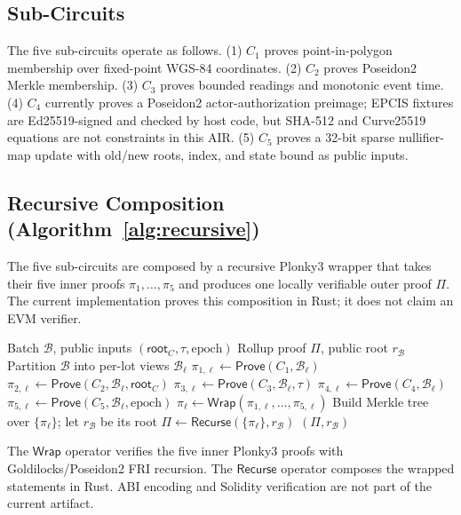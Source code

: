 \documentclass[journal]{IEEEtran}
\begin{document}
\subsection{Sub-Circuits}
The five sub-circuits operate as follows. (1) $C_1$ proves point-in-polygon membership over fixed-point WGS-84 coordinates. (2) $C_2$ proves Poseidon2 Merkle membership. (3) $C_3$ proves bounded readings and monotonic event time. (4) $C_4$ currently proves a Poseidon2 actor-authorization preimage; EPCIS fixtures are Ed25519-signed and checked by host code, but SHA-512 and Curve25519 equations are not constraints in this AIR. (5) $C_5$ proves a 32-bit sparse nullifier-map update with old/new roots, index, and state bound as public inputs.

\subsection{Recursive Composition (Algorithm~\ref{alg:recursive})}
The five sub-circuits are composed by a recursive Plonky3 wrapper that takes their five inner proofs $\pi_1, \dots, \pi_5$ and produces one locally verifiable outer proof $\Pi$. The current implementation proves this composition in Rust; it does not claim an EVM verifier.

\begin{algorithm}[h]
\caption{Recursive EPCIS Proof Composition}
\label{alg:recursive}
\begin{algorithmic}[1]
\REQUIRE Batch $\mathcal{B}$, public inputs $(\mathsf{root}_C, \tau, \text{epoch})$
\ENSURE Rollup proof $\Pi$, public root $r_{\mathcal{B}}$
\STATE Partition $\mathcal{B}$ into per-lot views $\mathcal{B}_\ell$
  \STATE $\pi_{1,\ell} \gets \mathsf{Prove}(C_1, \mathcal{B}_\ell)$
  \STATE $\pi_{2,\ell} \gets \mathsf{Prove}(C_2, \mathcal{B}_\ell, \mathsf{root}_C)$
  \STATE $\pi_{3,\ell} \gets \mathsf{Prove}(C_3, \mathcal{B}_\ell, \tau)$
  \STATE $\pi_{4,\ell} \gets \mathsf{Prove}(C_4, \mathcal{B}_\ell)$
  \STATE $\pi_{5,\ell} \gets \mathsf{Prove}(C_5, \mathcal{B}_\ell, \text{epoch})$
  \STATE $\pi_\ell \gets \mathsf{Wrap}(\pi_{1,\ell}, \dots, \pi_{5,\ell})$
\ENDFOR
\STATE Build Merkle tree over $\{\pi_\ell\}$; let $r_{\mathcal{B}}$ be its root
\STATE $\Pi \gets \mathsf{Recurse}(\{\pi_\ell\}, r_{\mathcal{B}})$
\RETURN $(\Pi, r_{\mathcal{B}})$
\end{algorithmic}
\end{algorithm}

The $\mathsf{Wrap}$ operator verifies the five inner Plonky3 proofs with Goldilocks/Poseidon2 FRI recursion. The $\mathsf{Recurse}$ operator composes the wrapped statements in Rust. ABI encoding and Solidity verification are not part of the current artifact.
\end{document}
